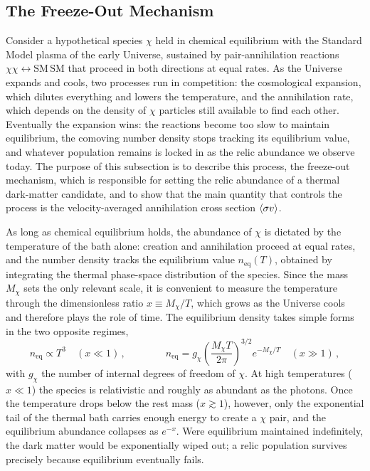 
\subsection{The Freeze-Out Mechanism}
\label{sec:1.2.2}

Consider a hypothetical species $\chi$ held in chemical equilibrium with the Standard Model plasma of the early Universe, sustained by pair-annihilation reactions $\chi\chi \leftrightarrow \mathrm{SM}\,\mathrm{SM}$ that proceed in both directions at equal rates.
As the Universe expands and cools, two processes run in competition: the cosmological expansion, which dilutes everything and lowers the temperature, and the annihilation rate, which depends on the density of $\chi$ particles still available to find each other.
Eventually the expansion wins: the reactions become too slow to maintain equilibrium, the comoving number density stops tracking its equilibrium value, and whatever population remains is locked in as the relic abundance we observe today.
The purpose of this subsection is to describe this process, the freeze-out mechanism, which is responsible for setting the relic abundance of a thermal dark-matter candidate, and to show that the main quantity that controls the process is the velocity-averaged annihilation cross section $\langle \sigma v \rangle$.

As long as chemical equilibrium holds, the abundance of $\chi$ is dictated by the temperature of the bath alone: creation and annihilation proceed at equal rates, and the number density tracks the equilibrium value $n_\mathrm{eq}(T)$, obtained by integrating the thermal phase-space distribution of the species.
Since the mass $M_\chi$ sets the only relevant scale, it is convenient to measure the temperature through the dimensionless ratio $x \equiv M_\chi/T$, which grows as the Universe cools and therefore plays the role of time.
The equilibrium density takes simple forms in the two opposite regimes,
\begin{equation}
	n_\mathrm{eq} \propto T^3 \quad (x \ll 1)\,,
	\qquad\qquad
	n_\mathrm{eq} = g_\chi \left(\frac{M_\chi T}{2\pi}\right)^{3/2} e^{-M_\chi/T} \quad (x \gg 1)\,,
	\label{eq:neq}
\end{equation}
with $g_\chi$ the number of internal degrees of freedom of $\chi$.
At high temperatures ($x \ll 1$) the species is relativistic and roughly as abundant as the photons.
Once the temperature drops below the rest mass ($x \gtrsim 1$), however, only the exponential tail of the thermal bath carries enough energy to create a $\chi$ pair, and the equilibrium abundance collapses as $e^{-x}$.
Were equilibrium maintained indefinitely, the dark matter would be exponentially wiped out; a relic population survives precisely because equilibrium eventually fails.

